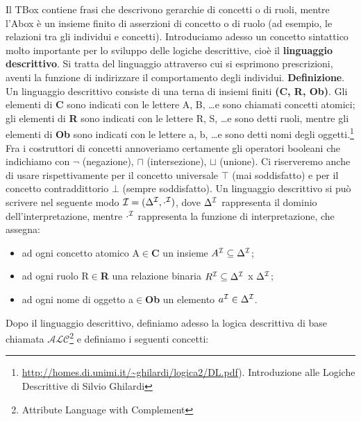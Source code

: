 \documentclass[a4paper,11pt]{article}
\newcommand{\alc}{%
   \ensuremath{\mathcal{ALC}}\xspace}
\newcommand{\I}{%
        \ensuremath{\mathcal{I}}\xspace}
\begin{document}
Il TBox contiene frasi che descrivono gerarchie di concetti o di ruoli, mentre l'Abox è un insieme finito di asserzioni di concetto o di ruolo (ad esempio, le relazioni tra gli individui e concetti).\newline
Introduciamo adesso un concetto sintattico molto importante per lo sviluppo delle logiche descrittive, cioè il \textbf{linguaggio descrittivo}.
Si tratta del linguaggio attraverso cui si esprimono prescrizioni, aventi la funzione di indirizzare il comportamento degli individui. \newline
\textbf{Definizione}. \newline Un linguaggio descrittivo consiste di una terna di insiemi finiti \textbf{(C, R, Ob)}. Gli elementi di \textbf{C} sono indicati con le lettere A, B, \ldots e sono chiamati concetti atomici; gli elementi di \textbf{R} sono indicati con le lettere R, S, \ldots e sono detti
ruoli, mentre gli elementi di \textbf{Ob} sono indicati con le lettere a, b, \ldots e sono detti nomi degli oggetti.\footnote{ \url{http://homes.di.unimi.it/~ghilardi/logica2/DL.pdf}). Introduzione alle Logiche Descrittive di Silvio Ghilardi}\newline
Fra i costruttori di concetti annoveriamo certamente gli operatori booleani che indichiamo con $\neg$ (negazione), $\sqcap$ (intersezione), $\sqcup$ (unione). \newline Ci riserveremo anche di usare rispettivamente per il concetto universale $\top$ (mai soddisfatto) e  per il concetto contraddittorio $\bot$ (sempre soddisfatto).\newline
Un linguaggio descrittivo si può scrivere nel seguente modo $\I = (\Delta^\I,\cdot^\I)$, dove $\Delta^\I$ rappresenta il dominio dell'interpretazione, 
mentre $\cdot^\I$ rappresenta la funzione di interpretazione, che assegna:
\begin{itemize}
	\item ad ogni concetto atomico A$\in$\textbf{C} un insieme  $A^{\I}\subseteq \Delta^\I$;
	\item ad ogni ruolo R$\in$\textbf{R} una relazione binaria $R^{\I}\subseteq 	\Delta^{\I}$ x $\Delta^{\I} $;
	\item ad ogni nome di oggetto a$\in$\textbf{Ob} un elemento $a^{\I}\in \Delta^\I$.
\end{itemize}  Dopo il linguaggio descrittivo, definiamo adesso la logica descrittiva di base chiamata $\alc$\footnote{Attribute Language with Complement} e definiamo i seguenti concetti:
\end{document}
